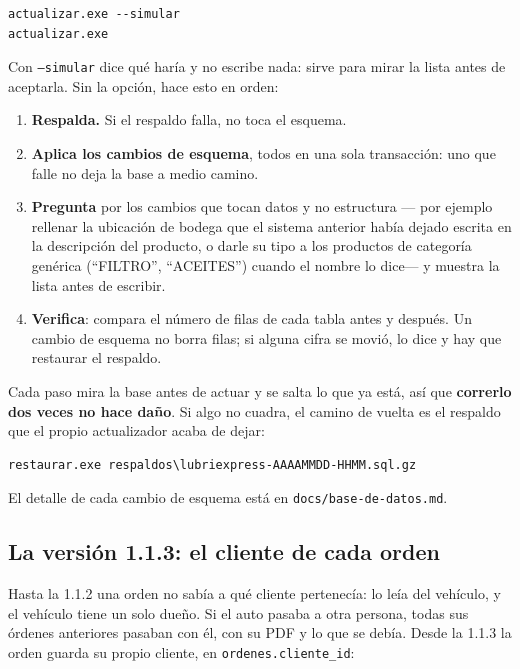 \documentclass[11pt,a4paper]{article}
\begin{document}
\begin{lstlisting}
actualizar.exe --simular
actualizar.exe
\end{lstlisting}

Con \texttt{--simular} dice qué haría y no escribe nada: sirve para mirar la
lista antes de aceptarla. Sin la opción, hace esto en orden:

\begin{enumerate}
  \item \textbf{Respalda.} Si el respaldo falla, no toca el esquema.
  \item \textbf{Aplica los cambios de esquema}, todos en una sola transacción:
        uno que falle no deja la base a medio camino.
  \item \textbf{Pregunta} por los cambios que tocan datos y no estructura ---
        por ejemplo rellenar la ubicación de bodega que el sistema anterior
        había dejado escrita en la descripción del producto, o darle su tipo a
        los productos de categoría genérica (``FILTRO'', ``ACEITES'') cuando el
        nombre lo dice--- y muestra la lista antes de escribir.
  \item \textbf{Verifica}: compara el número de filas de cada tabla antes y
        después. Un cambio de esquema no borra filas; si alguna cifra se movió,
        lo dice y hay que restaurar el respaldo.
\end{enumerate}

Cada paso mira la base antes de actuar y se salta lo que ya está, así que
\textbf{correrlo dos veces no hace daño}. Si algo no cuadra, el camino de vuelta
es el respaldo que el propio actualizador acaba de dejar:

\begin{lstlisting}
restaurar.exe respaldos\lubriexpress-AAAAMMDD-HHMM.sql.gz
\end{lstlisting}

El detalle de cada cambio de esquema está en \texttt{docs/base-de-datos.md}.

\subsection{La versión 1.1.3: el cliente de cada orden}
\label{sec:cliente-orden}

Hasta la 1.1.2 una orden no sabía a qué cliente pertenecía: lo leía del vehículo,
y el vehículo tiene un solo dueño. Si el auto pasaba a otra persona, todas sus
órdenes anteriores pasaban con él, con su PDF y lo que se debía. Desde la 1.1.3
la orden guarda su propio cliente, en \texttt{ordenes.cliente\_id}:
\end{document}
